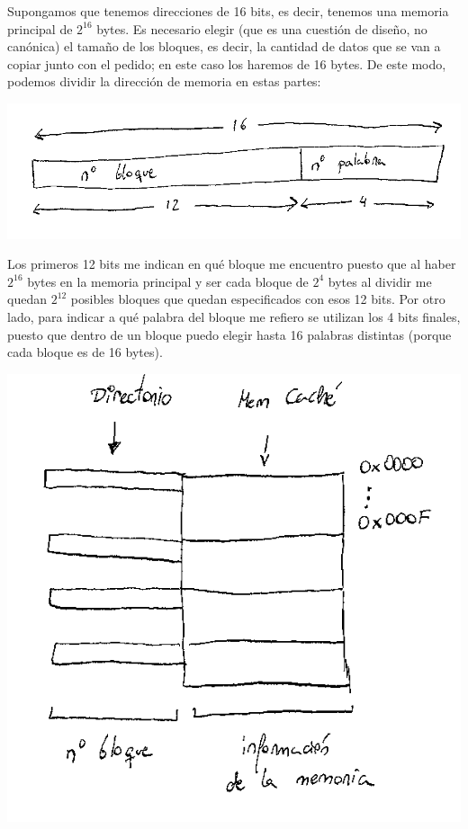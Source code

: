\documentclass[a4paper,10pt]{book}
\begin{document}
Supongamos que tenemos direcciones de 16 bits, es decir, tenemos una memoria principal de $2^{16}$ bytes. Es necesario elegir (que es una cuestión de diseño, no canónica) el tamaño de los bloques, es decir, la cantidad de datos que se van a copiar junto con el pedido; en este caso los haremos de 16 bytes. De este modo, podemos dividir la dirección de memoria en estas partes:
\begin{center}
\includegraphics[scale=1]{division de direccion}
\end{center}
Los primeros 12 bits me indican en qué bloque me encuentro puesto que al haber $2^{16}$ bytes en la memoria principal y ser cada bloque de $2^4$ bytes al dividir me quedan $2^{12}$ posibles bloques que quedan especificados con esos 12 bits. Por otro lado, para indicar a qué palabra del bloque me refiero se utilizan los 4 bits finales, puesto que dentro de un bloque puedo elegir hasta 16 palabras distintas (porque cada bloque es de 16 bytes).
\begin{center}
\includegraphics[scale=1]{memoria cache} 
\end{center}
\end{document}
